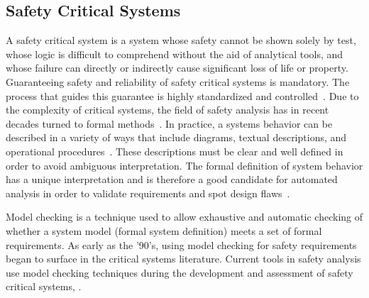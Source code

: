 \subsection{Safety Critical Systems}
\label{sec:SA_background}
A safety critical system is a system whose safety cannot be shown solely by test, whose logic is difficult to comprehend without the aid of analytical tools, and whose failure can directly or indirectly cause significant loss of life or property\cite{SAE:ARP4761}. Guaranteeing safety and reliability of safety critical systems is mandatory. The process that guides this guarantee is highly standardized and controlled~\cite{RTCA:StdC,SAE:ARP4761}. Due to the complexity of critical systems, the field of safety analysis has in recent decades turned to formal methods~\cite{mattarei,Bozzano:2010:DSA:1951720}. In practice, a systems behavior can be described in a variety of ways that include diagrams, textual descriptions, and operational procedures~\cite{SAE:ARP4754A}. These descriptions must be clear and well defined in order to avoid ambiguous interpretation. The formal definition of system behavior has a unique interpretation and is therefore a good candidate for automated analysis in order to validate requirements and spot design flaws~\cite{Joshi05:Dasc}. 

Model checking is a technique used to allow exhaustive and automatic checking of whether a system model (formal system definition) meets a set of formal requirements. As early as the '90's, using model checking for safety requirements began to surface in the critical systems literature\cite{DBLP:conf/safecomp/CimattiGMRTT98,DBLP:conf/edcc/BernardeschiFGM96}. Current tools in safety analysis use model checking techniques during the development and assessment of safety critical systems, \cite{mattarei,CAV2015:BoCiGrMa,symbAltaRica,DBLP:conf/tacas/BittnerBCCGGMMZ16}.






